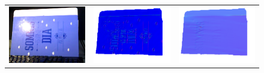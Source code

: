 \begin{figure}[!ht]
\centering
\setlength{\tabcolsep}{0.1em} %
 {\renewcommand{\arraystretch}{1.6}%
\begin{tabular}{c|c c}
   \includegraphics[height = 0.24\linewidth]{figures/result/robust_folder_rgb.pdf} 
   &
   \includegraphics[height = 0.24\linewidth]{figures/result/rgbd_folder_normal.pdf} &
   \includegraphics[height = 0.24\linewidth]{figures/result/robust_folder_normal.pdf} \\


\end{tabular}}
\end{figure}
